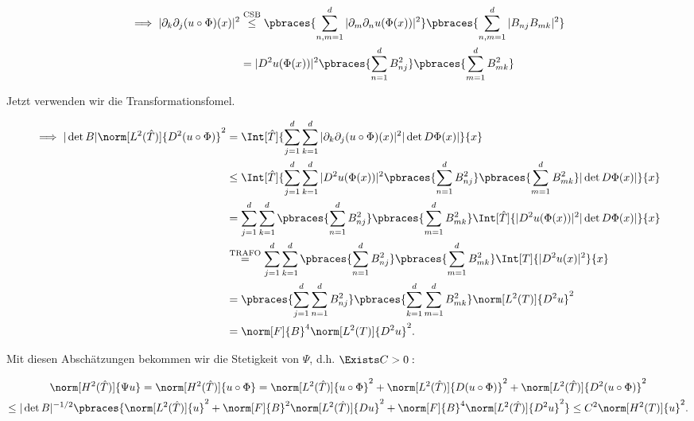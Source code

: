 \begin{solution}
\begin{enumerate}[label = \arabic*.]
  \begin{align*}
    \implies
    |\partial_k \partial_j (u \circ \Phi)(x)|^2
    &\stackrel
    {
      \mathrm{CSB}
    }
    {\leq}
    \pbraces
    {
      \sum_{n,m=1}^d
      |\partial_m \partial_n u(\Phi(x))|^2
    }
    \pbraces
    {
      \sum_{n,m=1}^d |B_{nj} B_{mk}|^2
    } \\
    &=
    |D^2 u(\Phi(x))|^2
    \pbraces
    {
      \sum_{n=1}^d
      B_{nj}^2
    }
    \pbraces
    {
      \sum_{m=1}^d
      B_{mk}^2
    }
  \end{align*}

  Jetzt verwenden wir die Transformationsfomel.

  \begin{align*}
    \implies
    |\det B| \norm[L^2(\hat T)]{D^2(u\circ\Phi)}^2
    & =
    \Int[\hat T]
    {
      \sum_{j=1}^d
      \sum_{k=1}^d
      |\partial_k \partial_j (u \circ \Phi)(x)|^2
      |\det D\Phi(x)|
    }{x} \\
    & \leq
    \Int[\hat T]
    {
      \sum_{j=1}^d
      \sum_{k=1}^d
      |D^2 u (\Phi(x))|^2
      \pbraces
      {
        \sum_{n=1}^d
        B_{nj}^2
      }
      \pbraces
      {
        \sum_{m=1}^d
        B_{mk}^2
      }
      |\det D \Phi(x)|
    }{x} \\
    & =
    \sum_{j=1}^d
    \sum_{k=1}^d
    \pbraces
    {
      \sum_{n=1}^d
      B_{nj}^2
    }
    \pbraces
    {
      \sum_{m=1}^d
      B_{mk}^2
    }
    \Int[\hat T]
    {
      |D^2 u (\Phi(x))|^2
      |\det D \Phi(x)|
    }{x} \\
    & \stackrel
    {
      \mathrm{TRAFO}
    }{=}
    \sum_{j=1}^d
    \sum_{k=1}^d
    \pbraces
    {
      \sum_{n=1}^d
      B_{nj}^2
    }
    \pbraces
    {
      \sum_{m=1}^d
      B_{mk}^2
    }
    \Int[T]{|D^2 u(x)|^2}{x} \\
    & =
    \pbraces
    {
      \sum_{j=1}^d
      \sum_{n=1}^d
      B_{nj}^2
    }
    \pbraces
    {
      \sum_{k=1}^d
      \sum_{m=1}^d
      B_{mk}^2
    }
    \norm[L^2(T)]{D^2 u}^2 \\
    & =
    \norm[F]{B}^4 \norm[L^2(T)]{D^2 u}^2.
  \end{align*}

\end{enumerate}

Mit diesen Abschätzungen bekommen wir die Stetigkeit von $\Psi$, d.h. $\Exists C > 0:$

\begin{multline*}
  \norm[H^2(\hat T)]{\Psi u}
  =
  \norm[H^2(\hat T)]{u \circ \Phi}
  =
  \norm[L^2(\hat T)]{u \circ \Phi}^2
  +
  \norm[L^2(\hat T)]{D (u \circ \Phi)}^2
  +
  \norm[L^2(\hat T)]{D^2 (u \circ \Phi)}^2 \\
  \leq
  |\det B|^{-1/2}
  \pbraces
  {
    \norm[L^2(\hat T)]{u}^2
    +
    \norm[F]{B}^2
    \norm[L^2(\hat T)]{Du}^2
    +
    \norm[F]{B}^4
    \norm[L^2(\hat T)]{D^2 u}^2
  }
  \leq
  C^2 \norm[H^2(T)]{u}^2.
\end{multline*}


\end{solution}

